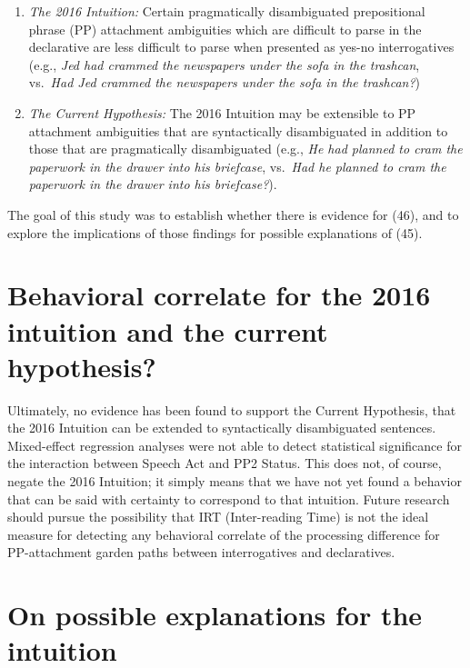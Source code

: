 \documentclass[11pt,oneside]{book}
\begin{document}
\begin{enumerate}
\def\labelenumi{(\arabic{enumi})}
\setcounter{enumi}{44}
\item
  \emph{The 2016 Intuition:} Certain pragmatically disambiguated prepositional phrase (PP) attachment ambiguities which are difficult to parse in the declarative are less difficult to parse when presented as yes-no interrogatives (e.g., \emph{Jed had crammed the newspapers under the sofa in the trashcan}, vs.~\emph{Had Jed crammed the newspapers under the sofa in the trashcan?})
\item
  \emph{The Current Hypothesis:} The 2016 Intuition may be extensible to PP attachment ambiguities that are syntactically disambiguated in addition to those that are pragmatically disambiguated (e.g., \emph{He had planned to cram the paperwork in the drawer into his briefcase}, vs.~\emph{Had he planned to cram the paperwork in the drawer into his briefcase?}).
\end{enumerate}

The goal of this study was to establish whether there is evidence for (46), and to explore the implications of those findings for possible explanations of (45).

\hypertarget{behavioral-correlate-for-the-2016-intuition-and-the-current-hypothesis}{%
\section{Behavioral correlate for the 2016 intuition and the current hypothesis?}\label{behavioral-correlate-for-the-2016-intuition-and-the-current-hypothesis}}

Ultimately, no evidence has been found to support the Current Hypothesis, that the 2016 Intuition can be extended to syntactically disambiguated sentences. Mixed-effect regression analyses were not able to detect statistical significance for the interaction between Speech Act and PP2 Status. This does not, of course, negate the 2016 Intuition; it simply means that we have not yet found a behavior that can be said with certainty to correspond to that intuition. Future research should pursue the possibility that IRT (Inter-reading Time) is not the ideal measure for detecting any behavioral correlate of the processing difference for PP-attachment garden paths between interrogatives and declaratives.

\hypertarget{on-possible-explanations-for-the-intuition}{%
\section{On possible explanations for the intuition}\label{on-possible-explanations-for-the-intuition}}
\end{document}
